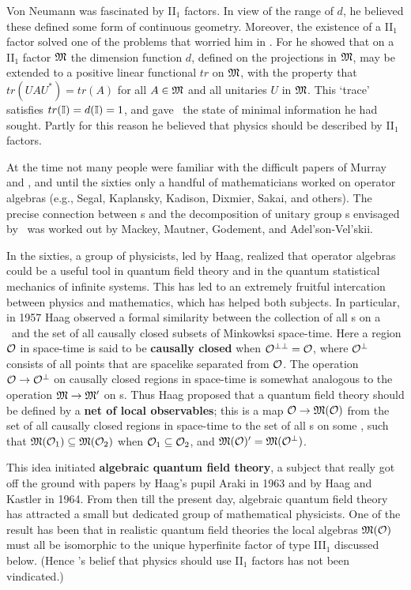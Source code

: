 Von Neumann was fascinated by II$\mbox{}_1$ factors. In view of the
range of $d$, he believed these defined some form of continuous
geometry. Moreover, the existence of a II$\mbox{}_1$ factor solved one
of the problems that worried him in \qm.  For he showed that on a
II$\mbox{}_1$ factor ${\frak M}$ the dimension function $d$, defined on the
projections in ${\frak M}$, may be extended to a positive linear functional
$tr$ on ${\frak M}$, with the property that $tr(UAU^*)=tr(A)$ for all
$A\in{\frak M}$ and all unitaries $U$ in ${\frak M}$.  This `trace' satisfies
$tr({\Bbb I})=d({\Bbb I})=1$, and gave \vN\ the state of minimal information he
had sought. Partly for this reason he believed that physics should be
described by II$\mbox{}_1$ factors.

At the time not many people were familiar with the difficult papers of
Murray and \vN, and until the sixties only a handful of mathematicians
worked on operator algebras (e.g., Segal, Kaplansky, Kadison, Dixmier,
Sakai, and others).  The precise connection between \vNa s and the
decomposition of unitary group \rep s envisaged by \vN\ was worked out
by Mackey, Mautner, Godement, and Adel'son-Vel'skii.

In the sixties, a group of physicists, led by Haag, realized that
operator algebras could be a useful tool in quantum field theory and
in the quantum statistical mechanics of infinite systems. This has led
to an extremely fruitful intercation between physics and mathematics,
which has helped both subjects.  In particular, in 1957 Haag observed
a formal similarity between the collection of all \vNa s on a \Hs\ and
the set of all causally closed subsets of Minkowksi space-time.  Here
a region ${\cal O}$ in space-time is said to be {\bf causally closed} when
${\cal O}^{\perp\perp}={\cal O}$, where ${\cal O}^{\perp}$ consists of all points
that are spacelike separated from ${\cal O}$.  The operation
${\cal O}\rightarrow{\cal O}^{\perp}$ on causally closed regions in space-time is
somewhat analogous to the operation ${\frak M}\rightarrow{\frak M}'$ on \vNa s. Thus Haag
proposed that a quantum field theory should be defined by a {\bf net
of local observables}; this is a map ${\cal O}\rightarrow{\frak M}({\cal O})$ from the set of
all causally closed regions in space-time to the set of all \vNa s on
some \Hs, such that ${\frak M}({\cal O}_1)\subseteq {\frak M}({\cal O}_2)$ when
${\cal O}_1\subseteq {\cal O}_2$, and ${\frak M}({\cal O})'={\frak M}({\cal O}^{\perp})$.

This idea initiated {\bf algebraic quantum field theory}, a subject
that really got off the ground with papers by Haag's pupil Araki in
1963 and by Haag and Kastler in 1964. From then till the present day,
algebraic quantum field theory has attracted a small but dedicated
group of mathematical physicists. One of the result has been that in
realistic quantum field theories the local algebras ${\frak M}({\cal O})$ must all
be isomorphic to the unique hyperfinite factor of type III$\mbox{}_1$
discussed below. (Hence \vN's belief that physics should use
II$\mbox{}_1$ factors has not been vindicated.)

